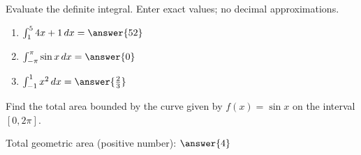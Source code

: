 \documentclass{ximera}
\begin{document}
\begin{problem}\label{prob:mth240exam3prob3}
Evaluate the definite integral.  Enter exact values; no decimal approximations.
  \begin{enumerate}
\item
$\int_1^5 4x+1\, dx=\answer{52}$

\item
$\int_{-\pi}^{\pi} \sin x\, dx=\answer{0}$

\item
$\int_{-1}^1 x^2\, dx=\answer{\frac{2}{3}}$

  \end{enumerate}

\end{problem}

\begin{problem}\label{prob:mth240exam3prob4}
Find the total area bounded by the curve given by $f(x)=\sin x$ on the interval $[0, 2\pi]$.

Total geometric area (positive number): $\answer{4}$
\end{problem}
\end{document}
